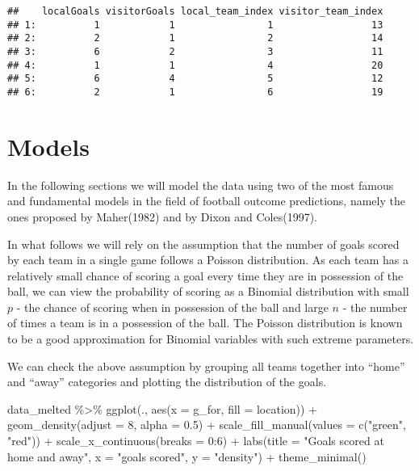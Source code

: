 \documentclass[
]{article}
\newenvironment{Shaded}{\begin{snugshade}}{\end{snugshade}}
\newcommand{\AttributeTok}[1]{\textcolor[rgb]{0.77,0.63,0.00}{#1}}
\newcommand{\DecValTok}[1]{\textcolor[rgb]{0.00,0.00,0.81}{#1}}
\newcommand{\FloatTok}[1]{\textcolor[rgb]{0.00,0.00,0.81}{#1}}
\newcommand{\FunctionTok}[1]{\textcolor[rgb]{0.00,0.00,0.00}{#1}}
\newcommand{\NormalTok}[1]{#1}
\newcommand{\SpecialCharTok}[1]{\textcolor[rgb]{0.00,0.00,0.00}{#1}}
\newcommand{\StringTok}[1]{\textcolor[rgb]{0.31,0.60,0.02}{#1}}
\begin{document}
\begin{verbatim}
##    localGoals visitorGoals local_team_index visitor_team_index
## 1:          1            1                1                 13
## 2:          2            1                2                 14
## 3:          6            2                3                 11
## 4:          1            1                4                 20
## 5:          6            4                5                 12
## 6:          2            1                6                 19
\end{verbatim}

\hypertarget{models}{%
\section{Models}\label{models}}

In the following sections we will model the data using two of the most
famous and fundamental models in the field of football outcome
predictions, namely the ones proposed by Maher(1982) and by Dixon and
Coles(1997).

In what follows we will rely on the assumption that the number of goals
scored by each team in a single game follows a Poisson distribution. As
each team has a relatively small chance of scoring a goal every time
they are in possession of the ball, we can view the probability of
scoring as a Binomial distribution with small \(p\) - the chance of
scoring when in possession of the ball and large \(n\) - the number of
times a team is in a possession of the ball. The Poisson distribution is
known to be a good approximation for Binomial variables with such
extreme parameters.

We can check the above assumption by grouping all teams together into
``home'' and ``away'' categories and plotting the distribution of the
goals.

\begin{Shaded}
\begin{Highlighting}[]
\NormalTok{data\_melted }\SpecialCharTok{\%\textgreater{}\%}
  \FunctionTok{ggplot}\NormalTok{(., }\FunctionTok{aes}\NormalTok{(}\AttributeTok{x =}\NormalTok{ g\_for, }\AttributeTok{fill =}\NormalTok{ location)) }\SpecialCharTok{+}
  \FunctionTok{geom\_density}\NormalTok{(}\AttributeTok{adjust =} \DecValTok{8}\NormalTok{, }\AttributeTok{alpha =} \FloatTok{0.5}\NormalTok{) }\SpecialCharTok{+}
  \FunctionTok{scale\_fill\_manual}\NormalTok{(}\AttributeTok{values =} \FunctionTok{c}\NormalTok{(}\StringTok{"green"}\NormalTok{, }\StringTok{"red"}\NormalTok{)) }\SpecialCharTok{+}
  \FunctionTok{scale\_x\_continuous}\NormalTok{(}\AttributeTok{breaks =} \DecValTok{0}\SpecialCharTok{:}\DecValTok{6}\NormalTok{) }\SpecialCharTok{+}
  \FunctionTok{labs}\NormalTok{(}\AttributeTok{title =} \StringTok{"Goals scored at home and away"}\NormalTok{,}
       \AttributeTok{x =} \StringTok{"goals scored"}\NormalTok{,}
       \AttributeTok{y =} \StringTok{"density"}\NormalTok{) }\SpecialCharTok{+}
  \FunctionTok{theme\_minimal}\NormalTok{()}
\end{Highlighting}
\end{Shaded}
\end{document}
